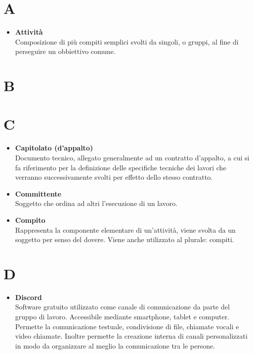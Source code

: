 


\tableofcontents{}
\chapter{A}
	\begin{itemize}
		\item \textbf{Attività}\\
		Composizione di più compiti semplici svolti da singoli, o gruppi, al fine di perseguire un obbiettivo comune.
	\end{itemize}
\chapter{B}
\chapter{C}
	\begin{itemize}
		\item \textbf{Capitolato (d'appalto)}\\
		Documento tecnico, allegato generalmente ad un contratto d'appalto, a cui si fa riferimento per la definizione delle specifiche tecniche dei lavori che verranno successivamente svolti per effetto dello stesso contratto. 		
		
		\item \textbf{Committente}\\
		Soggetto che ordina ad altri l'esecuzione di un lavoro.
		
		\item \textbf{Compito}\\
		Rappresenta la componente elementare di un'attività, viene svolta da un soggetto per senso del dovere.
		Viene anche utilizzato al plurale: compiti.
	\end{itemize}
\chapter{D}
	\begin{itemize}
		\item \textbf{Discord}\\
		Software gratuito utilizzato come canale di comunicazione da parte del gruppo di lavoro.
		Accessibile mediante smartphone, tablet e computer.
		Permette la comunicazione testuale, condivisione di file, chiamate vocali e video chiamate.
		Inoltre permette la creazione interna di canali personalizzati in modo da organizzare al meglio la comunicazione tra le persone.		
	\end{itemize}
